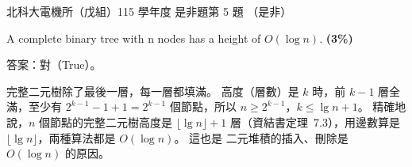 \begin{pastexam}[label={px:ntut-115-ee-ds-05}]{北科大電機所（戊組）115 學年度 是非題第 5 題}
（是非）

A complete binary tree with n nodes has a height of $O(\log n)$. \textbf{(3\%)}
\end{pastexam}

\begin{pastsoln}
答案：對（True）。

完整二元樹除了最後一層，每一層都填滿。 高度（層數）是 $k$ 時，前 $k - 1$ 層全滿，至少有
$2^{k-1} - 1 + 1 = 2^{k-1}$ 個節點，所以 $n \ge 2^{k-1}$，$k \le \lg n + 1$。 精確地說，$n$ 個節點的完整二元樹高度是
$\lfloor \lg n \rfloor + 1$ 層（資結書定理~7.3），用邊數算是 $\lfloor \lg n \rfloor$，兩種算法都是 $O(\log n)$。 這也是
二元堆積的插入、刪除是 $O(\log n)$ 的原因。
\end{pastsoln}
